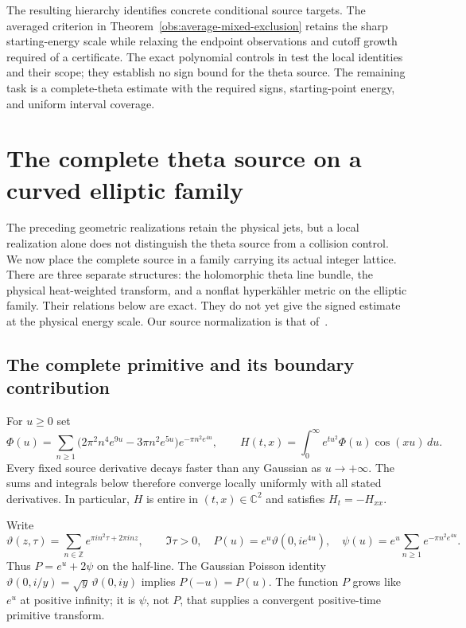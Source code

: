 \documentclass[11pt]{article}
\numberwithin{equation}{section}
\theoremstyle{definition}
\theoremstyle{remark}
\begin{document}
The resulting hierarchy identifies concrete conditional source targets.
The averaged criterion in Theorem~\ref{obs:average-mixed-exclusion}
retains the sharp starting-energy scale while relaxing the endpoint
observations and cutoff growth required of a certificate.  The exact polynomial controls in \cite{ThetaTurning,ThetaChord}
test the local identities and their scope; they establish no sign bound
for the theta source.  The remaining task is a complete-theta estimate
with the required signs, starting-point energy, and uniform interval
coverage.


\section{The complete theta source on a curved elliptic family}
\label{theta:section}

The preceding geometric realizations retain the physical jets, but a local
realization alone does not distinguish the theta source from a collision
control.  We now place the complete source in a family carrying its actual
integer lattice.  There are three separate structures: the holomorphic theta
line bundle, the physical heat-weighted transform, and a nonflat
hyperk\"ahler metric on the elliptic family.  Their relations below are exact.
They do not yet give the signed estimate at the physical energy scale.
Our source normalization is that of~\cite{BakerTheta}.

\subsection{The complete primitive and its boundary contribution}
\label{theta:primitive}

For $u\geq0$ set
\begin{equation}
 \Phi(u)=\sum_{n\geq1}
  \bigl(2\pi^2n^4e^{9u}-3\pi n^2e^{5u}\bigr)
                  e^{-\pi n^2e^{4u}},
 \qquad
 H(t,x)=\int_0^\infty e^{tu^2}\Phi(u)\cos(xu)\,du.
 \label{theta:physical-source}
\end{equation}
Every fixed source derivative decays faster than any Gaussian as
$u\to+\infty$.  The sums and integrals below therefore converge locally
uniformly with all stated derivatives.  In particular, $H$ is entire in
$(t,x)\in\mathbb C^2$ and satisfies $H_t=-H_{xx}$.

Write
\begin{equation}
 \vartheta(z,\tau)=\sum_{n\in\mathbb Z}
                   e^{\pi i n^2\tau+2\pi i nz},\qquad \Im\tau>0,
 \quad
 P(u)=e^u\vartheta(0,ie^{4u}),\quad
 \psi(u)=e^u\sum_{n\geq1}e^{-\pi n^2e^{4u}}.
 \label{theta:primitive-definitions}
\end{equation}
Thus $P=e^u+2\psi$ on the half-line.  The Gaussian Poisson identity
$\vartheta(0,i/y)=\sqrt y\,\vartheta(0,iy)$ implies $P(-u)=P(u)$.
The function $P$ grows like $e^u$ at positive infinity; it is $\psi$, not
$P$, that supplies a convergent positive-time primitive transform.
\end{document}
